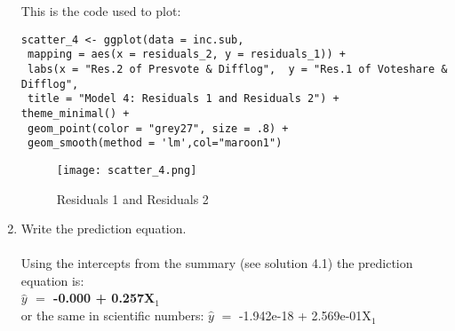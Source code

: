 \documentclass[12pt,letterpaper]{article}
\begin{document}
\begin{enumerate}
		This is the code used to plot:
		\begin{verbatim}
scatter_4 <- ggplot(data = inc.sub,                    
 mapping = aes(x = residuals_2, y = residuals_1)) +   
 labs(x = "Res.2 of Presvote & Difflog",  y = "Res.1 of Voteshare & Difflog",       
 title = "Model 4: Residuals 1 and Residuals 2") +  
theme_minimal() +  
 geom_point(color = "grey27", size = .8) +  
 geom_smooth(method = 'lm',col="maroon1")
		\end{verbatim}
		
		\begin{figure}[h!]
			\caption{\footnotesize{Residuals 1 and Residuals 2}}
			\vspace{.2cm}
			\centering
			\label{fig:}
			\texttt{[image: scatter\_4.png]}
		\end{figure}		
		
		 	\vspace{1cm}
		\item Write the prediction equation.\\\\
		Using the intercepts from the summary (see solution 4.1) the prediction equation is:\\
\textbf{$\hat{y}$ $=$ -0.000 + 0.257X$_1$}\\
or the same in scientific numbers: $\hat{y}$ $=$ -1.942e-18 + 2.569e-01X$_1$
\end{enumerate}
	
	\newpage	
\end{document}
